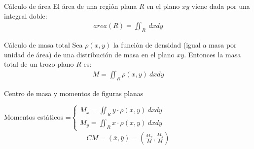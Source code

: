 \documentclass[a4paper, twoside]{article}
\numberwithin{equation}{section}
\numberwithin{figure}{section}
\numberwithin{table}{section}
\begin{document}
\begin{corolario*}{Cálculo de área}
	El área de una región plana $R$ en el plano $xy$ viene dada por una integral doble:
	\begin{align}
		area (R)=\iint_{R}\: dxdy
	\end{align}
\end{corolario*}

\begin{corolario*}{Cálculo de masa total}
	Sea $\rho(x,y)$ la función de densidad (igual a masa por unidad de área) de una distribución de masa en el plano $xy$. Entonces la masa total de un trozo plano $R$ es:
	\begin{align}
		M=\iint_{R}\rho\left(x,y\right)\: dxdy
	\end{align}
\end{corolario*}

\begin{corolario*}{Centro de masa y momentos de figuras planas}
	\begin{center}
		Momentos estáticos =$\left\{ \begin{array}{c}
		M_{x}=\iint_{R}y\cdot\rho\left(x,y\right)\: dxdy\\
		M_{y}=\iint_{R}x\cdot\rho\left(x,y\right)\: dxdy\end{array}\right.$
		\begin{align}
			CM=\left(\overline{x},\overline{y}\right)=\left(\frac{M_{x}}{M},\frac{M_{y}}{M}\right)
		\end{align}
		\par
	\end{center}
\end{corolario*}
\end{document}
